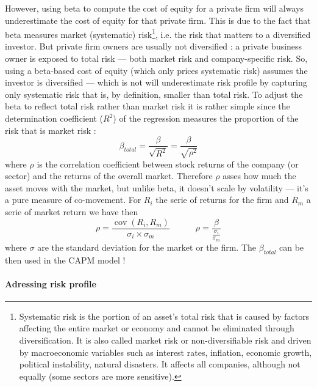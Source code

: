  However, using beta  to compute the cost of equity for a private firm will always underestimate the cost of equity for that private firm. This is due to the fact that beta measures market (systematic) risk\footnote{Systematic risk is the portion of an asset’s total risk that is caused by factors affecting the entire market or economy and cannot be eliminated through diversification. It is also called market risk or non-diversifiable risk and driven by macroeconomic variables such as interest rates, inflation, economic growth, political instability, natural disasters. It affects all companies, although not equally (some sectors are more sensitive).}, i.e. the risk that matters to a diversified investor. But private firm owners are usually not diversified : a private business owner is exposed to total risk — both market risk and company-specific risk.  So, using a beta-based cost of equity (which only prices systematic risk) assumes the investor is diversified — which is not will underestimate risk profile by capturing only systematic risk that is, by definition, smaller than total risk. To adjust the beta to reflect total risk rather than market risk it is rather simple since the determination coefficient ($R^2$) of the regression measures the proportion of the risk that is market risk :
 \begin{equation}
      \beta_{total} = \frac{\beta}{\sqrt{R^2}} = \frac{\beta}{\sqrt{\rho^2}}
 \end{equation}
where $\rho$ is the correlation coefficient between stock returns of the company (or sector) and the returns of the overall market. Therefore $\rho$ asses how much the asset moves with the market, but unlike beta, it doesn't scale by volatility — it’s a pure measure of co-movement. For $R_i$ the serie of returns for the firm and $R_m$ a serie of market return we have then 
\begin{equation}
    \rho = \frac{\operatorname{cov}(R_i,R_m)}{\sigma_i\times\sigma_m} \qquad \quad \rho = \frac{\beta}{\displaystyle\frac{\sigma_i}{\sigma_m}}
\end{equation}
where $\sigma$ are the standard deviation for the market or the firm. The $\beta_{total}$ can be then used in the CAPM model !

\paragraph{Adressing risk profile}

